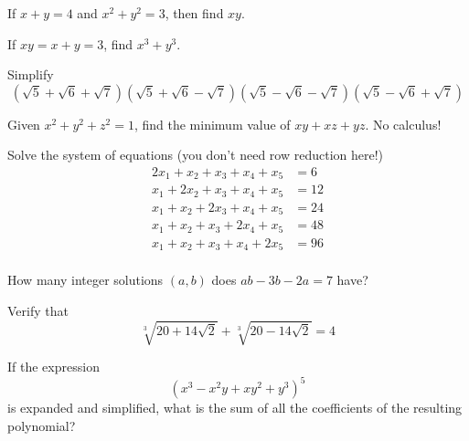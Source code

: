 \documentclass[12pt]{article}
\begin{document}
        \begin{exercise}
            If $x+y = 4$ and $x^2 + y^2 = 3$, then find $xy$.
        \end{exercise}

        \begin{exercise}
            If $xy=x+y = 3$, find $x^3+y^3$.
        \end{exercise}

        \begin{exercise}
            Simplify
            \[\left(\sqrt{5}+\sqrt{6}+\sqrt{7}\right)\left(\sqrt{5}+\sqrt{6}-\sqrt{7}\right)\left(\sqrt{5}-\sqrt{6}-\sqrt{7}\right)\left(\sqrt{5}-\sqrt{6}+\sqrt{7}\right)\]
        \end{exercise}

        \begin{exercise}
            Given $x^2 + y^2 + z^2 = 1$, find the minimum value of $xy+xz+yz$. No calculus!
        \end{exercise}

        \begin{exercise}
            Solve the system of equations (you don't need row reduction here!)
            \begin{align*}
                2x_1+x_2+x_3+x_4+x_5&=6 \\
                x_1+2x_2+x_3+x_4+x_5&=12 \\
                x_1+x_2+2x_3+x_4+x_5&=24 \\
                x_1+x_2+x_3+2x_4+x_5&=48 \\
                x_1+x_2+x_3+x_4+2x_5&=96 \\
            \end{align*}
        \end{exercise}

        \begin{exercise}
            How many integer solutions \((a,b)\) does \(ab-3b-2a=7\) have?
        \end{exercise}

        \begin{exercise}
            Verify that
            \[\sqrt[3]{20+14\sqrt{2}}+\sqrt[3]{20-14\sqrt{2}}=4\]
        \end{exercise}

        \begin{exercise}
            If the expression 
            \[(x^3-x^2y+xy^2+y^3)^5\] 
            is expanded and simplified, what is the sum of all the coefficients of the resulting polynomial?
        \end{exercise}
\end{document}
